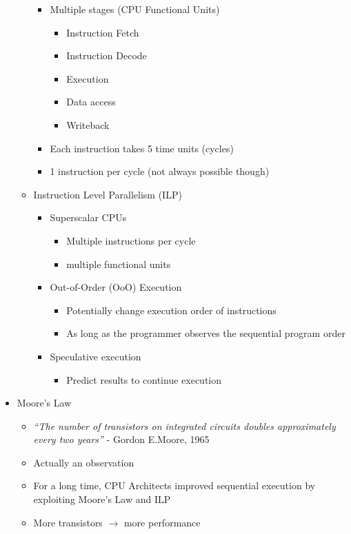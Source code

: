 \documentclass[a4paper]{article}
\begin{document}
\begin{itemize}
\begin{itemize}
\begin{itemize}
\item Multiple stages (CPU Functional Units)
\begin{itemize}
\item Instruction Fetch
\item Instruction Decode
\item Execution
\item Data access
\item Writeback
\end{itemize}
\item Each instruction takes 5 time units (cycles)
\item 1 instruction per cycle (not always possible though)
\end{itemize}
\item Instruction Level Parallelism (ILP)
\begin{itemize}
\item Superscalar CPUs
\begin{itemize}
\item Multiple instructions per cycle
\item multiple functional units
\end{itemize}
\item Out-of-Order (OoO) Execution
\begin{itemize}
\item Potentially change execution order of instructions
\item As long as the programmer observes the sequential program order
\end{itemize}
\item Speculative execution
\begin{itemize}
\item Predict results to continue execution
\end{itemize}
\end{itemize}
\end{itemize}
\item Moore's Law
\begin{itemize}
\item\emph{``The number of transistors on integrated circuits doubles approximately every two years''} - Gordon E.Moore, 1965
\item Actually an observation
\item For a long time, CPU Architects improved sequential execution by exploiting Moore's Law and ILP
\item More transistors $\to$ more performance
\end{itemize}
\end{itemize}
\end{document}
